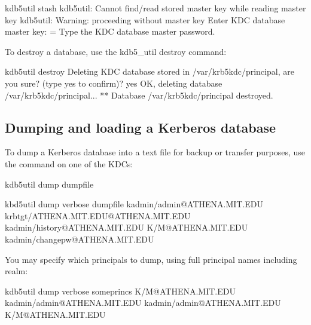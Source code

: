 \documentclass[letterpaper,10pt,english]{sphinxmanual}
\begin{document}
\begin{sphinxVerbatim}[commandchars=\\\{\}]
\PYGZdl{} kdb5\PYGZus{}util stash
kdb5\PYGZus{}util: Cannot find/read stored master key while reading master key
kdb5\PYGZus{}util: Warning: proceeding without master key
Enter KDC database master key:  \PYGZlt{}= Type the KDC database master password.
\end{sphinxVerbatim}

\sphinxAtStartPar
To destroy a database, use the kdb5\_util destroy command:

\begin{sphinxVerbatim}[commandchars=\\\{\}]
\PYGZdl{} kdb5\PYGZus{}util destroy
Deleting KDC database stored in \PYGZsq{}/var/krb5kdc/principal\PYGZsq{}, are you sure?
(type \PYGZsq{}yes\PYGZsq{} to confirm)? yes
OK, deleting database \PYGZsq{}/var/krb5kdc/principal\PYGZsq{}...
** Database \PYGZsq{}/var/krb5kdc/principal\PYGZsq{} destroyed.
\end{sphinxVerbatim}


\subsection{Dumping and loading a Kerberos database}
\label{\detokenize{admin/database:dumping-and-loading-a-kerberos-database}}\label{\detokenize{admin/database:restore-from-dump}}
\sphinxAtStartPar
To dump a Kerberos database into a text file for backup or transfer
purposes, use the {\hyperref[\detokenize{admin/admin_commands/kdb5_util:kdb5-util-8}]{}}  command on one of the
KDCs:

\begin{sphinxVerbatim}[commandchars=\\\{\}]
\PYGZdl{} kdb5\PYGZus{}util dump dumpfile

\PYGZdl{} kbd5\PYGZus{}util dump \PYGZhy{}verbose dumpfile
kadmin/admin@ATHENA.MIT.EDU
krbtgt/ATHENA.MIT.EDU@ATHENA.MIT.EDU
kadmin/history@ATHENA.MIT.EDU
K/M@ATHENA.MIT.EDU
kadmin/changepw@ATHENA.MIT.EDU
\end{sphinxVerbatim}

\sphinxAtStartPar
You may specify which principals to dump, using full principal names
including realm:

\begin{sphinxVerbatim}[commandchars=\\\{\}]
\PYGZdl{} kdb5\PYGZus{}util dump \PYGZhy{}verbose someprincs K/M@ATHENA.MIT.EDU kadmin/admin@ATHENA.MIT.EDU
kadmin/admin@ATHENA.MIT.EDU
K/M@ATHENA.MIT.EDU
\end{sphinxVerbatim}
\end{document}
